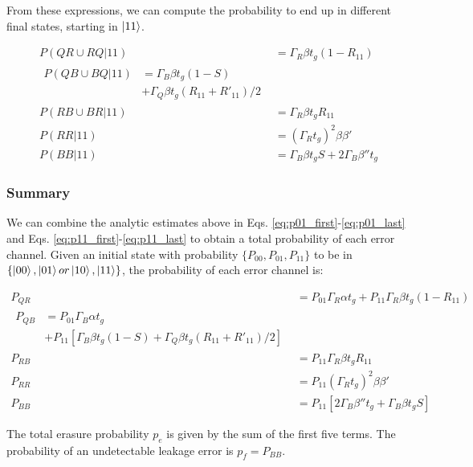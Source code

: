 \documentclass[%
reprint,
superscriptaddress,
 amsmath,amssymb,
 aps,
 prx,
floatfix,
]{revtex4-1}
\begin{document}
From these expressions, we can compute the probability to end up in different final states, starting in $\ket{11}$.

\begin{align}
\label{eq:p11_first}
    P(QR\cup RQ|11) &= \Gamma_R \beta t_g (1-R_{11}) \\
    \begin{split}
    P(QB\cup BQ|11) &= \Gamma_B \beta t_g (1-S) \\ &+ \Gamma_Q \beta t_g(R_{11} + R'_{11})/2
    \end{split}\\
    P(RB\cup BR|11) &= \Gamma_R \beta t_g R_{11} \\
    P(RR | 11) &= (\Gamma_R t_g)^2 \beta \beta' \\
    P(BB | 11) &= \Gamma_B \beta t_g S + 2 \Gamma_B \beta'' t_g
\label{eq:p11_last}
\end{align}

\subsubsection{Summary}

We can combine the analytic estimates above in Eqs. \eqref{eq:p01_first}-\eqref{eq:p01_last} and Eqs. \eqref{eq:p11_first}-\eqref{eq:p11_last} to obtain a total probability of each error channel. Given an initial state with probability $\{P_{00},P_{01},P_{11}\}$ to be in $\{\ket{00},\ket{01} or \ket{10},\ket{11}\}$, the probability of each error channel is:

\begin{align}
\label{eq:finalprobfirst}
    P_{QR} &= P_{01} \Gamma_R \alpha t_g + P_{11} \Gamma_R \beta t_g (1-R_{11}) \\
    \begin{split}
    P_{QB} &= P_{01} \Gamma_B \alpha t_g \\
    &+ P_{11} \left[\Gamma_B \beta t_g (1-S) + \Gamma_Q \beta t_g (R_{11}+R'_{11})/2\right]
    \end{split} \\
    P_{RB} &= P_{11} \Gamma_R \beta t_g R_{11} \\
    P_{RR} &= P_{11} (\Gamma_R t_g)^2 \beta \beta' \\
    P_{BB} &= P_{11} \left[2 \Gamma_B \beta'' t_g + \Gamma_B \beta t_g S\right]
\label{eq:finalproblast}
\end{align}

The total erasure probability $p_e$ is given by the sum of the first five terms. The probability of an undetectable leakage error is $p_f = P_{BB}$.
\end{document}
